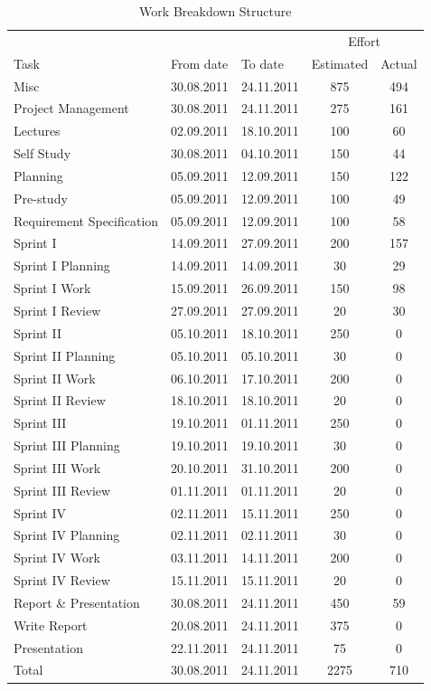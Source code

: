 \begin{table}[!ht] \footnotesize \center
\caption{Work Breakdown Structure\label{tab:wbs}}
\begin{tabular}{l l l c c}
	\toprule
	& & & \multicolumn{2}{c}{Effort} \\
	\cmidrule(r){4-5}
	Task & From date & To date & Estimated & Actual  \\
	\midrule
	Misc & 30.08.2011 & 24.11.2011 & 875 & 494  \\
	\midrule
	Project Management & 30.08.2011 & 24.11.2011 & 275 &161 \\
	Lectures & 02.09.2011 & 18.10.2011 & 100 & 60 \\
	Self Study & 30.08.2011 & 04.10.2011 & 150 & 44 \\
	Planning & 05.09.2011 & 12.09.2011 & 150 & 122 \\
	Pre-study & 05.09.2011 & 12.09.2011 & 100 & 49 \\
	Requirement Specification & 05.09.2011 & 12.09.2011 & 100 & 58 \\
	\midrule
	Sprint I & 14.09.2011 & 27.09.2011 & 200 & 157 \\
	\midrule
	Sprint I Planning & 14.09.2011 & 14.09.2011 & 30 & 29 \\
	Sprint I Work & 15.09.2011 & 26.09.2011 & 150 & 98 \\
	Sprint I Review & 27.09.2011 & 27.09.2011 & 20 & 30 \\
	\midrule
	Sprint II & 05.10.2011 & 18.10.2011 & 250 & 0 \\
	\midrule
	Sprint II Planning & 05.10.2011 & 05.10.2011 & 30 & 0 \\
	Sprint II Work & 06.10.2011 & 17.10.2011 & 200 & 0 \\
	Sprint II Review & 18.10.2011 & 18.10.2011 & 20 & 0 \\
	\midrule
	Sprint III & 19.10.2011 & 01.11.2011 & 250 & 0 \\
	\midrule
	Sprint III Planning & 19.10.2011 & 19.10.2011 & 30 & 0 \\
	Sprint III Work & 20.10.2011 & 31.10.2011 & 200 & 0 \\
	Sprint III Review & 01.11.2011 & 01.11.2011 & 20 & 0 \\
	\midrule
	Sprint IV & 02.11.2011 & 15.11.2011 & 250 & 0 \\
	\midrule
	Sprint IV Planning & 02.11.2011 & 02.11.2011 & 30 & 0 \\
	Sprint IV Work & 03.11.2011 & 14.11.2011 & 200 & 0 \\
	Sprint IV Review & 15.11.2011 & 15.11.2011 & 20 & 0 \\
	\midrule
	Report \& Presentation & 30.08.2011 & 24.11.2011 & 450 & 59 \\
	\midrule
	Write Report & 20.08.2011 & 24.11.2011 & 375 & 0 \\
	Presentation & 22.11.2011 & 24.11.2011 & 75 & 0 \\
	\midrule
	Total & 30.08.2011 & 24.11.2011 & 2275 & 710 \\
	\bottomrule
\end{tabular}
\end{table}

